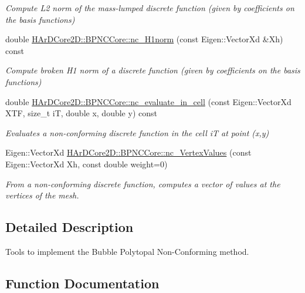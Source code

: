 \begin{DoxyCompactItemize}
\begin{DoxyCompactList}\small\item\em Compute L2 norm of the mass-\/lumped discrete function (given by coefficients on the basis functions) \end{DoxyCompactList}\item 
\mbox{\label{group__BPNC_ga3d9e24f90636c4a8a5cac49f03e7ff59}} 
double \hyperlink{group__BPNC_ga3d9e24f90636c4a8a5cac49f03e7ff59}{H\+Ar\+D\+Core2\+D\+::\+B\+P\+N\+C\+Core\+::nc\+\_\+\+H1norm} (const Eigen\+::\+Vector\+Xd \&Xh) const
\begin{DoxyCompactList}\small\item\em Compute broken H1 norm of a discrete function (given by coefficients on the basis functions) \end{DoxyCompactList}\item 
\mbox{\label{group__BPNC_ga7a82bab8fa4bfe4f99796db632d9411d}} 
double \hyperlink{group__BPNC_ga7a82bab8fa4bfe4f99796db632d9411d}{H\+Ar\+D\+Core2\+D\+::\+B\+P\+N\+C\+Core\+::nc\+\_\+evaluate\+\_\+in\+\_\+cell} (const Eigen\+::\+Vector\+Xd X\+TF, size\+\_\+t iT, double x, double y) const
\begin{DoxyCompactList}\small\item\em Evaluates a non-\/conforming discrete function in the cell iT at point (x,y) \end{DoxyCompactList}\item 
Eigen\+::\+Vector\+Xd \hyperlink{group__BPNC_ga2c3a632143dcb66992710d39cfb9ed42}{H\+Ar\+D\+Core2\+D\+::\+B\+P\+N\+C\+Core\+::nc\+\_\+\+Vertex\+Values} (const Eigen\+::\+Vector\+Xd Xh, const double weight=0)
\begin{DoxyCompactList}\small\item\em From a non-\/conforming discrete function, computes a vector of values at the vertices of the mesh. \end{DoxyCompactList}\end{DoxyCompactItemize}


\subsection{Detailed Description}
Tools to implement the Bubble Polytopal Non-\/\+Conforming method. 



\subsection{Function Documentation}
\mbox{\label{group__BPNC_ga85e80578aa553215feae11284549b354}} 
